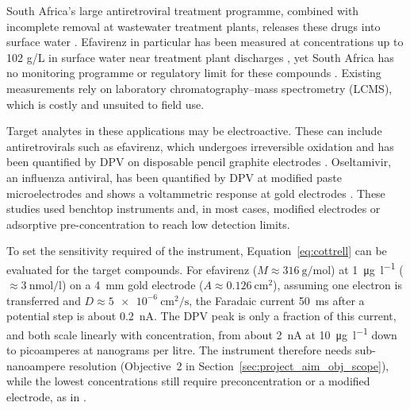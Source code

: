 \label{sec:dpv_applications}

South Africa's large antiretroviral treatment programme, combined with incomplete removal at wastewater treatment plants, releases these drugs into surface water \cite{schoeman2017efavirenz}. 
Efavirenz in particular has been measured at concentrations up to 102 \textmu g/L in surface water near treatment plant discharges \cite{vogt_arv_sa_waters}, 
yet South Africa has no monitoring programme or regulatory limit for these compounds \cite{schoeman2017efavirenz}. Existing measurements rely on laboratory chromatography--mass spectrometry (LCMS), which is costly and unsuited to field use.

Target analytes in these applications may be electroactive. These can include antiretrovirals such as efavirenz, which undergoes irreversible oxidation and has been quantified by \ac{DPV} on disposable pencil graphite electrodes \cite{dogantopal2009efavirenz}. Oseltamivir, an influenza antiviral, has been quantified by \ac{DPV} at modified paste microelectrodes \cite{pop2012oseltamivir} and shows a voltammetric response at gold electrodes \cite{avramov2011oseltamivir}. These studies used benchtop instruments and, in most cases, modified electrodes or adsorptive pre-concentration to reach low detection limits.

To set the sensitivity required of the instrument, Equation~\ref{eq:cottrell} can be evaluated for the target compounds. For efavirenz ($M \approx \SI{316}{\gram\per\mole}$) at \SI{1}{\micro\gram\per\litre} ($\approx \SI{3}{\nano\mole\per\litre}$) on a \SI{4}{\milli\metre} gold electrode ($A \approx \SI{0.126}{\centi\metre\squared}$), assuming one electron is transferred and $D \approx \SI{5e-6}{\centi\metre\squared\per\second}$, the Faradaic current \SI{50}{\milli\second} after a potential step is about \SI{0.2}{\nano\ampere}. The \ac{DPV} peak is only a fraction of this current, and both scale linearly with concentration, from about \SI{2}{\nano\ampere} at \SI{10}{\micro\gram\per\litre} down to picoamperes at nanograms per litre. The instrument therefore needs sub-nanoampere resolution (Objective~2 in Section~\ref{sec:project_aim_obj_scope}), while the lowest concentrations still require preconcentration or a modified electrode, as in \cite{dogantopal2009efavirenz,pop2012oseltamivir}.

\label{sec:potentiostat_fundamentals}

